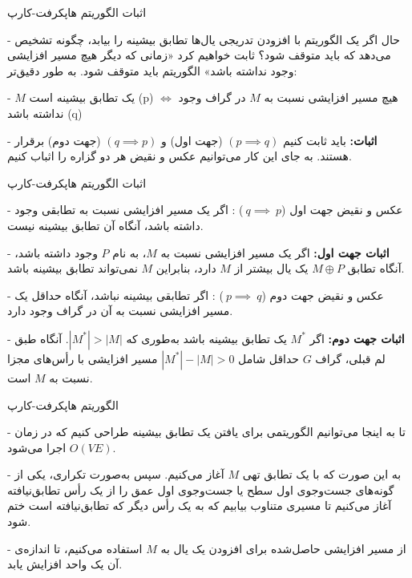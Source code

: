 \begin{itemframe}{اثبات الگوریتم هاپکرفت-کارپ}
\item[-]
حال اگر یک الگوریتم با افزودن تدریجی یال‌ها تطابق بیشینه را بیابد، چگونه تشخیص می‌دهد که باید متوقف شود؟ ثابت خواهیم کرد «زمانی که دیگر هیچ مسیر افزایشی وجود نداشته باشد» الگوریتم باید متوقف شود. به طور دقیق‌تر:
\item[-]
$M$ یک تطابق بیشینه است (p)
$\iff$
 هیچ مسیر افزایشی نسبت به $M$ در گراف وجود نداشته باشد (q)

\item[-]
\textbf{اثبات:}
باید ثابت کنیم
$(p \implies q) $
 (جهت اول) و
$ (q \implies p)$
 (جهت دوم) برقرار هستند. به جای این کار می‌توانیم عکس و نقیض
 هر دو گزاره را اثباب کنیم.

\end{itemframe}


\begin{itemframe}{اثبات الگوریتم هاپکرفت-کارپ}
\item[-]
عکس و نقیض جهت اول
($~q\implies~p$)
: اگر یک مسیر افزایشی نسبت به تطابقی وجود داشته باشد، آنگاه آن تطابق بیشینه نیست.
\item[-]
\textbf{اثبات جهت اول:}
اگر یک مسیر افزایشی نسبت به $M$، به نام $P$ وجود داشته باشد، آنگاه تطابق $M \oplus P$ یک یال بیشتر از $M$ دارد، بنابراین $M$ نمی‌تواند تطابق بیشینه باشد.

\item[-]
عکس و نقیض جهت دوم
($‍~p \implies ~q$)
: اگر تطابقی بیشینه نباشد، آنگاه حداقل یک مسیر افزایشی نسبت به آن در گراف وجود دارد.
\item[-]
\textbf{اثبات جهت دوم:}
اگر $M^*$ یک تطابق بیشینه باشد به‌طوری که $|M^*| > |M|$. آنگاه طبق لم قبلی، گراف $G$ حداقل شامل
$|M^*| - |M| > 0$
 مسیر افزایشی با رأس‌های مجزا نسبت به $M$ است.
\end{itemframe}


\begin{itemframe}{الگوریتم هاپکرفت-کارپ}
\item[-]
تا به اینجا می‌توانیم الگوریتمی برای یافتن یک تطابق بیشینه طراحی کنیم که در زمان $O(VE)$ اجرا می‌شود.
\item[-]
به این صورت که با یک تطابق تهی $M$ آغاز می‌کنیم. سپس به‌صورت تکراری، یکی از گونه‌های جست‌وجوی اول سطح یا جست‌وجوی اول عمق را از یک رأس تطابق‌نیافته آغاز می‌کنیم تا مسیری متناوب بیابیم که به یک رأس دیگر که تطابق‌نیافته است ختم شود.
\item[-]
از مسیر افزایشی حاصل‌شده برای افزودن یک یال به $M$ استفاده می‌کنیم، تا اندازه‌ی آن یک واحد افزایش یابد.
\end{itemframe}


